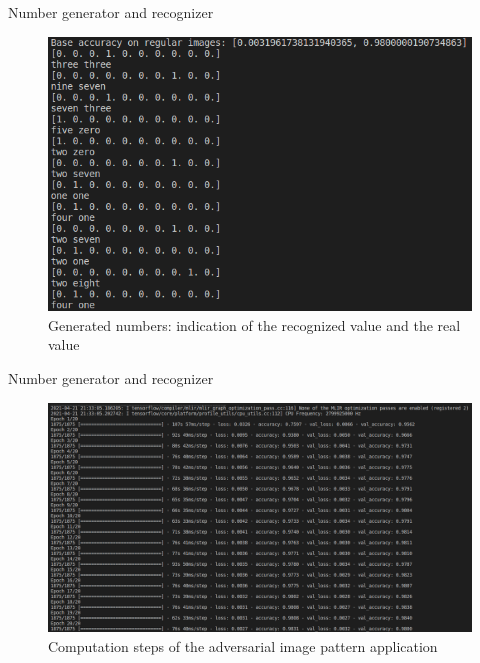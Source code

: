 \documentclass[8pt]{beamer}
\begin{document}
\begin{frame}{Number generator and recognizer}
\begin{figure} 
    \includegraphics[scale=0.3]{images/immagini_matrix/valori_numeri_matrice.png}
    \vspace*{0mm}
    \caption{Generated numbers: indication of the recognized value and the real value}
\end{figure}
\end{frame}

\begin{frame}{Number generator and recognizer}
\begin{figure} 
    \includegraphics[scale=0.244]{images/immagini_matrix/step_matrix_computation.png}
    \vspace*{-5mm}
    \caption{Computation steps of the adversarial image pattern application}
\end{figure}
\end{frame}
\end{document}
